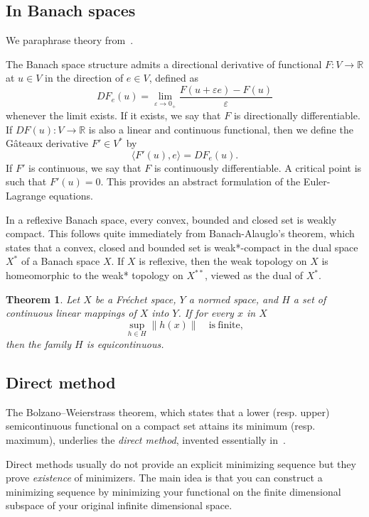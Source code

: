 \documentclass{article}
\theoremstyle{plain}
\newtheorem{teo}{Theorem}[section]
\theoremstyle{definition}
\numberwithin{equation}{section}
\newcommand{\R}{\ensuremath{\mathbb{R}}}
\begin{document}
\subsection{In Banach spaces}
We paraphrase theory from~\cite[Chapter 17]{grinfeld2014mathematical}.

The Banach space structure admits a directional derivative of functional $F:V\to\R$ at $u\in V$ in the direction of $e\in V$, defined as
\[
DF_e(u) = \lim_{\varepsilon\to 0_+}\frac{F(u+\varepsilon e)-F(u)}{\varepsilon}
\]
whenever the limit exists. If it exists, we say that $F$ is directionally differentiable. If $DF(u):V\to\R$ is also a linear and continuous functional, then we define the Gâteaux derivative $F'\in V^*$ by
\[
\langle F'(u),e\rangle=DF_e(u).
\]
If $F'$ is  continuous, we say that $F$ is  continuously differentiable. A critical point is such that $F'(u)=0$. This provides an abstract formulation of the Euler-Lagrange equations.


In a reflexive Banach space, every convex, bounded and closed set is weakly compact. This follows quite immediately from Banach-Alauglo's theorem, which states that a convex, closed and bounded set is weak*-compact in the dual space $X^*$ of a Banach space $X$. If $X$ is reflexive, then the weak topology on $X$ is homeomorphic to the weak* topology on  $X^{**}$, viewed as the dual of $X^*$. 

\begin{teo}
Let $X$ be a Fréchet space, $Y$ a normed space, and $H$ a set of continuous linear mappings of $X$ into $Y$. If for every $x$ in $X$
\[
\sup_{h\in H} \|h(x)\|\quad\mathrm{is\ finite,}
\]
then the family $H$ is equicontinuous.
\end{teo}

\subsection{Direct method}
The Bolzano–Weierstrass theorem, which states that a lower (resp. upper) semicontinuous functional on a compact set attains its minimum (resp. maximum), underlies the \textit{direct method}, invented essentially in~\cite{tonelli1915methode}.

Direct methods usually do not provide an explicit minimizing sequence but they prove \textit{existence} of minimizers.  The main idea is that you can construct a minimizing sequence by minimizing your functional on the finite dimensional subspace of your original infinite dimensional space.
\end{document}
